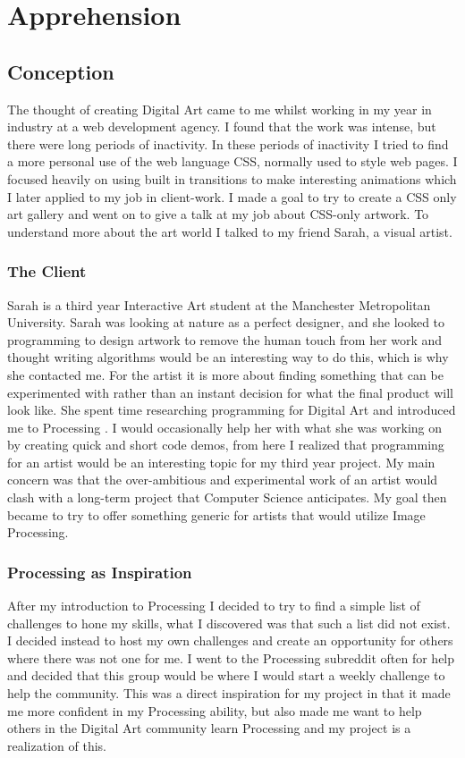 \documentclass[a4paper]{report}
\begin{document}
\section{Apprehension}
\subsection{Conception}
The thought of creating Digital Art came to me whilst working in my year in industry at a web development agency. I found that the work was intense, but there were long periods of inactivity. In these periods of inactivity I tried to find a more personal use of the web language CSS, normally used to style web pages. I focused heavily on using built in transitions to make interesting animations which I later applied to my job in client-work. I made a goal to try to create a CSS only art gallery and went on to give a talk at my job about CSS-only artwork. To understand more about the art world I talked to my friend Sarah, a visual artist.

\subsubsection{The Client}
Sarah is a third year Interactive Art student at the Manchester Metropolitan University. Sarah was looking at nature as a perfect designer, and she looked to programming to design artwork to remove the human touch from her work and thought writing algorithms would be an interesting way to do this, which is why she contacted me. For the artist it is more about finding something that can be experimented with rather than an instant decision for what the final product will look like. She spent time researching programming for Digital Art and introduced me to Processing \cite{PROCESSING}. I would occasionally help her with what she was working on by creating quick and short code demos, from here I realized that programming for an artist would be an interesting topic for my third year project. My main concern was that the over-ambitious and experimental work of an artist would clash with a long-term project that Computer Science anticipates. My goal then became to try to offer something generic for artists that would utilize Image Processing. 

\subsubsection{Processing as Inspiration}
After my introduction to Processing I decided to try to find a simple list of challenges to hone my skills, what I discovered was that such a list did not exist. I decided instead to host my own challenges and create an opportunity for others where there was not one for me. I went to the Processing subreddit\cite{RPROCESSING} often for help and decided that this group would be where I would start a weekly challenge to help the community. This was a direct inspiration for my project in that it made me more confident in my Processing ability, but also made me want to help others in the Digital Art community learn Processing and my project is a realization of this.
\end{document}
